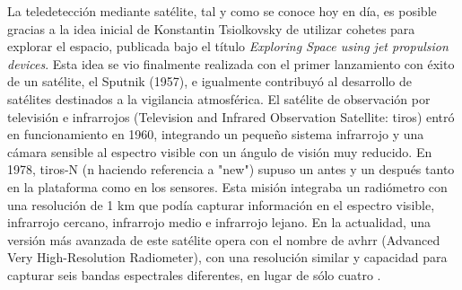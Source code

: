 La teledetección mediante satélite, tal y como se conoce hoy en día, es posible gracias a la idea inicial de Konstantin Tsiolkovsky de utilizar cohetes para explorar el espacio, publicada bajo el título \textit{Exploring Space using jet propulsion devices}. Esta idea se vio finalmente realizada con el primer lanzamiento con éxito de un satélite, el Sputnik (1957), e igualmente contribuyó al desarrollo de satélites destinados a la vigilancia atmosférica. El satélite de observación por televisión e infrarrojos (Television and Infrared Observation Satellite: \acrshort{tiros}) entró en funcionamiento en 1960, integrando un pequeño sistema infrarrojo y una cámara sensible al espectro visible con un ángulo de visión muy reducido. En 1978, \acrshort{tiros}-N (n haciendo referencia a "new") supuso un antes y un después tanto en la plataforma como en los sensores. Esta misión integraba un radiómetro con una resolución de 1 \si{\kilo\meter} que podía capturar información en el espectro visible, infrarrojo cercano, infrarrojo medio e infrarrojo lejano. En la actualidad, una versión más avanzada de este satélite opera con el nombre de \acrshort{avhrr} (Advanced Very High-Resolution Radiometer), con una resolución similar y capacidad para capturar seis bandas espectrales diferentes, en lugar de sólo cuatro \cite{national_oceanic_and_atmospheric_administration_avhrr3_nodate}.   

